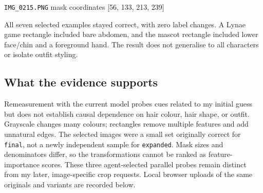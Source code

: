 \documentclass[11pt]{article}
\begin{document}
\par\noindent\begin{minipage}{\linewidth}
\texttt{IMG\_0215.PNG} mask coordinates [56, 133, 213, 239]
\end{minipage}\par\medskip
All seven selected examples stayed correct, with zero label changes. A Lynae game rectangle included bare abdomen, and the mascot rectangle included lower face/chin and a foreground hand. The result does not generalise to all characters or isolate outfit styling.
\subsection*{What the evidence supports}
Remeasurement with the current model probes cues related to my initial guess but does not establish causal dependence on hair colour, hair shape, or outfit. Grayscale changes many colours; rectangles remove multiple features and add unnatural edges. The selected images were a small set originally correct for \texttt{final}, not a newly independent sample for \texttt{expanded}. Mask sizes and denominators differ, so the transformations cannot be ranked as feature-importance scores. These three agent-selected parallel probes remain distinct from my later, image-specific crop requests. Local browser uploads of the same originals and variants are recorded below.


\clearpage
\end{document}
